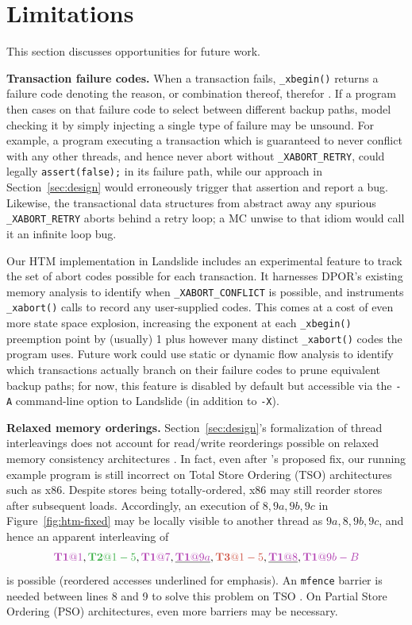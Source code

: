 \documentclass[10pt]{sigplanconf}
\begin{document}

\section{Limitations}
\label{sec:warpzone}

This section discusses opportunities for future work.

{\bf Transaction failure codes.}
When a transaction fails, {\tt \_xbegin()} returns a failure code
denoting the reason, or combination thereof, therefor \cite{htm-gcc}.
If a program then cases on that failure code to select between different backup paths,
model checking it by simply injecting a single type of failure may be unsound.
For example, a program executing a transaction which is guaranteed to never conflict with any other threads,
and hence never abort without {\tt \_XABORT\_RETRY},
could legally {\tt assert(false);} in its failure path,
while our approach in Section~\ref{sec:design} would erroneously trigger that assertion and report a bug.
Likewise, the transactional data structures from \cite{htm-mario}
abstract away any spurious {\tt \_XABORT\_RETRY} aborts behind a retry loop;
a MC unwise to that idiom would call it an infinite loop bug.

Our HTM implementation in Landslide includes an experimental feature
to track the set of abort codes possible for each transaction.
It harnesses DPOR's existing memory analysis to identify when {\tt \_XABORT\_CONFLICT} is possible,
and instruments {\tt \_xabort()} calls to record any user-supplied codes.
This comes at a cost of even more state space explosion,
increasing the exponent at each {\tt \_xbegin()} preemption point
by (usually) 1 plus however many distinct {\tt \_xabort()} codes the program uses.
Future work could use static or dynamic flow analysis to
identify which transactions actually branch on their failure codes
to prune equivalent backup paths;
for now, this feature is disabled by default but accessible via the {\tt -A} command-line option
to Landslide (in addition to {\tt -X}).

{\bf Relaxed memory orderings.}
Section~\ref{sec:design}'s formalization of thread interleavings does not account for read/write reorderings
possible on relaxed memory consistency architectures \cite{memory-consistency-models}.
In fact,
even after \cite{htm-mario}'s proposed fix,
our running example program is still incorrect on Total Store Ordering (TSO) architectures such as x86.
Despite stores being totally-ordered, x86 may still reorder stores after subsequent loads.
Accordingly, an execution of $8,9a,9b,9c$ in Figure~\ref{fig:htm-fixed}
may be locally visible to another thread as $9a,8,9b,9c$,
and hence an apparent interleaving of
\[
	\tiat{1},\tjat{1-5},\tiat{7},\underline{\tiat{9a}},\tkat{1-5},\underline{\tiat{8}},\tiat{9b-B}
\]
is possible
(reordered accesses underlined for emphasis).
An {\tt mfence} barrier is needed between lines 8 and 9 to solve this problem on TSO \cite{tsx-need-barrier}.
On Partial Store Ordering (PSO) architectures, even more barriers may be necessary.
\end{document}
